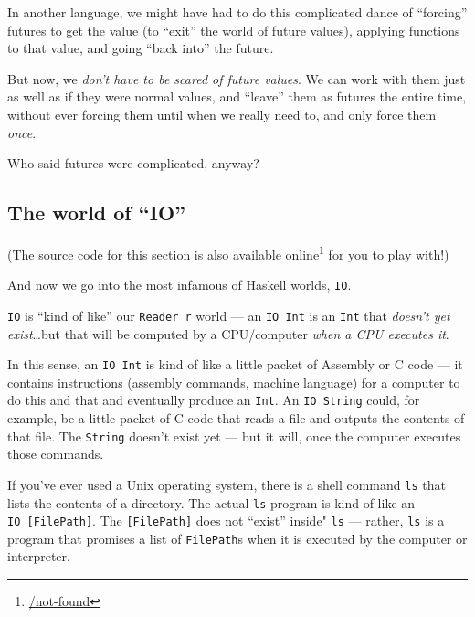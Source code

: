 \documentclass[]{article}
\renewcommand{\href}[2]{#2\footnote{\url{#1}}}
\begin{document}
In another language, we might have had to do this complicated dance of
``forcing'' futures to get the value (to ``exit'' the world of future
values), applying functions to that value, and going ``back into'' the
future.

But now, we \emph{don't have to be scared of future values}. We can work
with them just as well as if they were normal values, and ``leave'' them
as futures the entire time, without ever forcing them until when we
really need to, and only force them \emph{once}.

Who said futures were complicated, anyway?

\subsection{\texorpdfstring{The world of
``IO''}{The world of IO}}\label{the-world-of-io}

(The source code for this section is \href{/not-found}{also available
online} for you to play with!)

And now we go into the most infamous of Haskell worlds, \texttt{IO}.

\texttt{IO} is ``kind of like'' our \texttt{Reader\ r} world --- an
\texttt{IO\ Int} is an \texttt{Int} that \emph{doesn't yet
exist}\ldots{}but that will be computed by a CPU/computer \emph{when a
CPU executes it}.

In this sense, an \texttt{IO\ Int} is kind of like a little packet of
Assembly or C code --- it contains instructions (assembly commands,
machine language) for a computer to do this and that and eventually
produce an \texttt{Int}. An \texttt{IO\ String} could, for example, be a
little packet of C code that reads a file and outputs the contents of
that file. The \texttt{String} doesn't exist yet --- but it will, once
the computer executes those commands.

If you've ever used a Unix operating system, there is a shell command
\texttt{ls} that lists the contents of a directory. The actual
\texttt{ls} program is kind of like an \texttt{IO\ {[}FilePath{]}}. The
\texttt{{[}FilePath{]}} does not ``exist'' inside" \texttt{ls} ---
rather, \texttt{ls} is a program that promises a list of
\texttt{FilePath}s when it is executed by the computer or interpreter.
\end{document}
